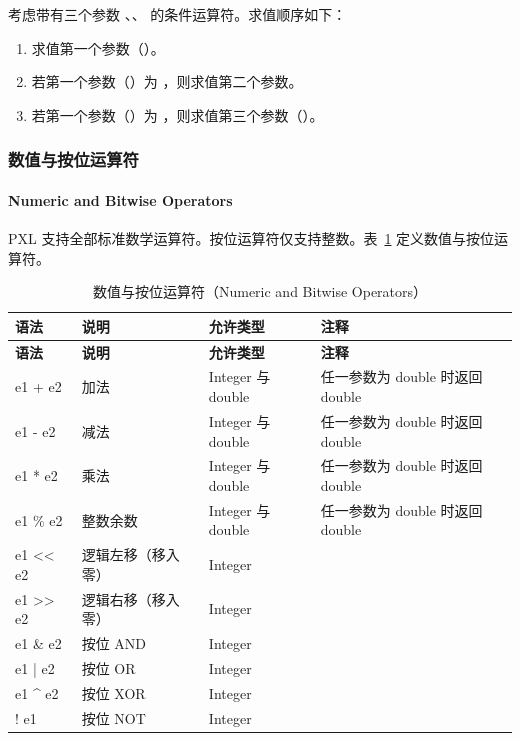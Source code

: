 考虑带有三个参数 、、 的条件运算符。求值顺序如下：
\begin{enumerate}
  \item 求值第一个参数（）。
  \item 若第一个参数（）为 ，则求值第二个参数。
  \item 若第一个参数（）为 ，则求值第三个参数（）。
\end{enumerate}

\subsubsection{数值与按位运算符}
\paragraph*{Numeric and Bitwise Operators}

PXL 支持全部标准数学运算符。按位运算符仅支持整数。表~\ref{tab:pxl-num-ops} 定义数值与按位运算符。

\begin{longtable}{@{}>{\raggedright\arraybackslash\ttfamily}p{} p{} p{} p{}@{}}
\caption{数值与按位运算符（Numeric and Bitwise Operators）}\label{tab:pxl-num-ops}\\
\toprule
\textbf{\textrm{语法}} & \textbf{\textrm{说明}} & \textbf{\textrm{允许类型}} & \textbf{\textrm{注释}} \\
\midrule
\endfirsthead
\toprule
\textbf{\textrm{语法}} & \textbf{\textrm{说明}} & \textbf{\textrm{允许类型}} & \textbf{\textrm{注释}} \\
\midrule
\endhead
\bottomrule
\endfoot
e1 + e2 & 加法 & Integer 与 double & 任一参数为 double 时返回 double \\
e1 - e2 & 减法 & Integer 与 double & 任一参数为 double 时返回 double \\
e1 * e2 & 乘法 & Integer 与 double & 任一参数为 double 时返回 double \\
e1 \% e2 & 整数余数 & Integer 与 double & 任一参数为 double 时返回 double \\
e1 << e2 & 逻辑左移（移入零） & Integer &  \\
e1 >> e2 & 逻辑右移（移入零） & Integer &  \\
e1 \& e2 & 按位 AND & Integer &  \\
e1 | e2 & 按位 OR & Integer &  \\
e1 \^{} e2 & 按位 XOR & Integer &  \\
! e1 & 按位 NOT & Integer &  \\
\end{longtable}

